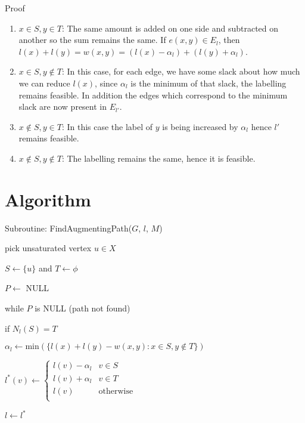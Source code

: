 \documentclass{article}
\begin{document}
\newpage
Proof
\begin{enumerate}
    \item $x \in S, y \in T$: The same amount is added on one side and subtracted on another so the sum remains the same. If $e(x, y) \in E_l$, then $l(x)+l(y) = w(x, y) = (l(x)-\alpha_l)+(l(y)+\alpha_l)$.
    \item $x \in S, y \notin T$: In this case, for each edge, we have some slack about how much we can reduce $l(x)$, since $\alpha_l$ is the minimum of that slack, the labelling remains feasible. In addition the edge\/s which correspond to the minimum slack are now present in $E_{l'}$.
    \item $x \notin S, y \in T$: In this case the label of $y$ is being increased by $\alpha_l$ hence $l'$ remains feasible.
    \item $x \notin S, y \notin T$: The labelling remains the same, hence it is feasible.
\end{enumerate}

\section{Algorithm}

Subroutine: FindAugmentingPath($G$, $l$, $M$) \dotfill

\hspace{1cm} pick unsaturated vertex $u \in X$

\hspace{1cm} $S \leftarrow \{u\}$ and $T \leftarrow \phi$

\hspace{1cm} $P \leftarrow$ NULL

\hspace{1cm} while $P$ is NULL (path not found)

\hspace{2cm} if $N_l(S) = T$ 

\hspace{3cm} $\alpha_l \leftarrow \mathrm{min}(\{l(x)+l(y)-w(x, y) : x \in S, y \notin T\})$

\hspace{3cm} $l^*(v) \leftarrow 
\begin{cases}
l(v)-\alpha_l & v \in S \\
l(v)+\alpha_l & v \in T \\
l(v) & \mathrm{otherwise} \\
\end{cases}$

\hspace{2cm} $l \leftarrow l^*$
\end{document}
